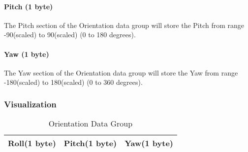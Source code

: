\documentclass{article}
\begin{document}
  \paragraph{Pitch (1 byte)}
  The Pitch section of the Orientation data group will store the Pitch from range -90(scaled) to 90(scaled) (0 to 180 degrees).  
  \paragraph{Yaw (1 byte)}
  The Yaw section of the Orientation data group will store the Yaw from range -180(scaled) to 180(scaled) (0 to 360 degrees).  
  
  \subsubsection{Visualization}
  \begin{table}[H]
  \centering
  \caption{Orientation Data Group}
  \label{Orientation}
  \begin{tabular}{|l|l|l|}
  \hline
Roll(1 byte) & Pitch(1 byte) & Yaw(1 byte) \\ \hline
  \end{tabular}
  \end{table}
  
  
  
  
\end{document}
